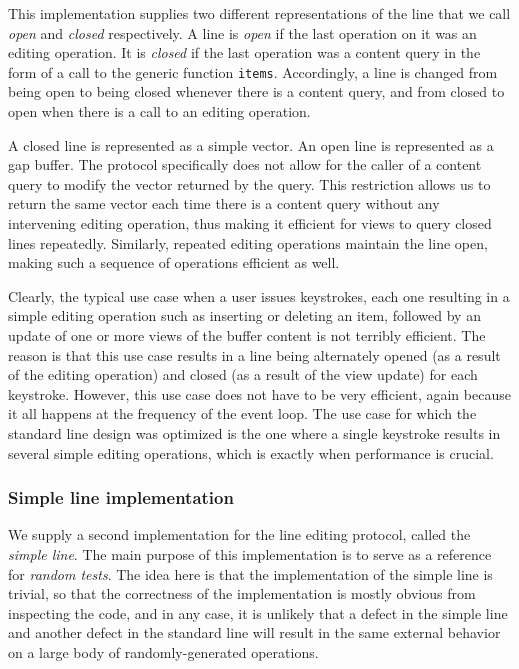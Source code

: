 This implementation supplies two different representations of the line
that we call \emph{open} and \emph{closed} respectively.  A line is
\emph{open} if the last operation on it was an editing operation.  It
is \emph{closed} if the last operation was a content query in the
form of a call to the generic function \texttt{items}.  Accordingly, a
line is changed from being open to being closed whenever there is a
content query, and from closed to open when there is a call to an
editing operation.

A closed line is represented as a \commonlisp{} simple vector.  An
open line is represented as a gap buffer. 
The protocol specifically does not allow for the caller of a content
query to modify the vector returned by the query.  This restriction
allows us to return the same vector each time there is a content
query without any intervening editing operation, thus making it
efficient for views to query closed lines repeatedly.  Similarly,
repeated editing operations maintain the line open, making such a
sequence of operations efficient as well.

Clearly, the typical use case when a user issues keystrokes, each one
resulting in a simple editing operation such as inserting or deleting
an item, followed by an update of one or more views of the buffer
content is not terribly efficient.  The reason is that this use case
results in a line being alternately opened (as a result of the editing
operation) and closed (as a result of the view update) for each
keystroke.  However, this use case does not have to be very efficient,
again because it all happens at the frequency of the event loop.  The
use case for which the standard line design was optimized is the one
where a single keystroke results in several simple editing operations,
which is exactly when performance is crucial.

\subsubsection{Simple line implementation}

We supply a second implementation for the line editing protocol,
called the \emph{simple line}.  The main purpose of this
implementation is to serve as a reference for \emph{random tests}.
The idea here is that the implementation of the simple line is
trivial, so that the correctness of the implementation is mostly
obvious from inspecting the code, and in any case, it is unlikely that
a defect in the simple line and another defect in the standard
line will result in the same external behavior on a large body of
randomly-generated operations.

